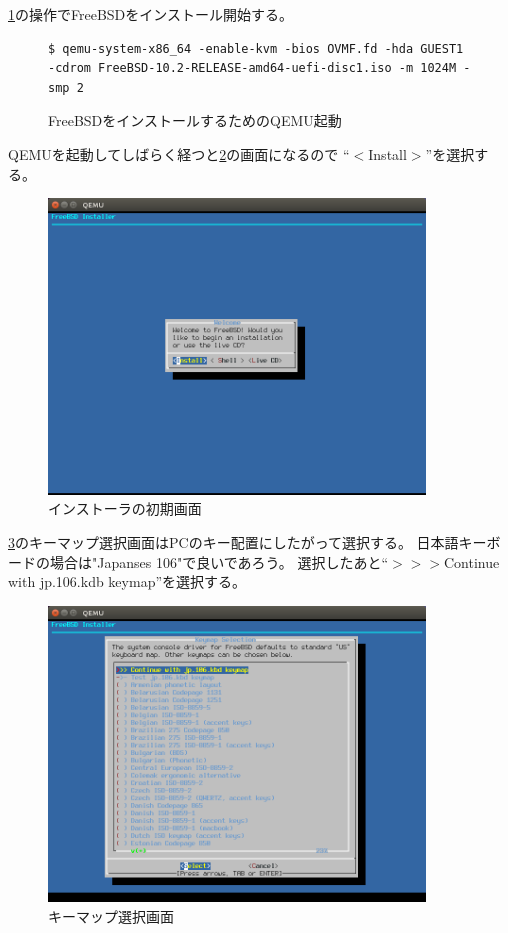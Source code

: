 \documentclass[a4j]{jarticle}
\begin{document}
\begin{multicols}{2}
\ref{fig:FreeBSD_QEMU}の操作でFreeBSDをインストール開始する。
\begin{figure}[htbp]
	\begin{center}
		\begin{lstlisting}[basicstyle=\ttfamily\footnotesize, frame=single, breaklines=true]
$ qemu-system-x86_64 -enable-kvm -bios OVMF.fd -hda GUEST1  -cdrom FreeBSD-10.2-RELEASE-amd64-uefi-disc1.iso -m 1024M -smp 2
		\end{lstlisting}
	\end{center}
	\caption{FreeBSDをインストールするためのQEMU起動}
	\label{fig:FreeBSD_QEMU}
\end{figure}

QEMUを起動してしばらく経つと\ref{fig:FreeBSD_TOP}の画面になるので
``$<$Install$>$''を選択する。
\begin{figure}[htbp]
	\begin{center}
    	\includegraphics[width=10cm]{./IMG/FreeBSD_TOP.png}
	\end{center}
    \caption{インストーラの初期画面}
    \label{fig:FreeBSD_TOP}
\end{figure}

\ref{fig:FreeBSD_KEY}のキーマップ選択画面はPCのキー配置にしたがって選択する。
日本語キーボードの場合は"Japanses 106"で良いであろう。
選択したあと``$>>>$Continue with jp.106.kdb keymap''を選択する。
\begin{figure}[htbp]
	\begin{center}
    	\includegraphics[width=10cm]{./IMG/FreeBSD_JP106.png}
	\end{center}
    \caption{キーマップ選択画面}
    \label{fig:FreeBSD_KEY}
\end{figure}


\end{multicols}
\end{document}
